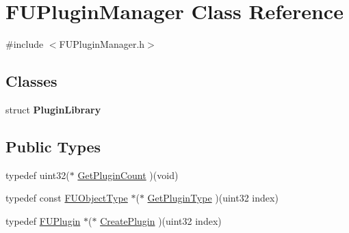 \hypertarget{classFUPluginManager}{
\section{FUPluginManager Class Reference}
\label{classFUPluginManager}
}


{\ttfamily \#include $<$FUPluginManager.h$>$}

\subsection*{Classes}
\begin{DoxyCompactItemize}
\item 
struct {\bfseries PluginLibrary}
\end{DoxyCompactItemize}
\subsection*{Public Types}
\begin{DoxyCompactItemize}
\item 
typedef uint32($\ast$ \hyperlink{classFUPluginManager_aa7465d51db4f1f1e0386310ae6922250}{GetPluginCount} )(void)
\item 
typedef const \hyperlink{classFUObjectType}{FUObjectType} $\ast$($\ast$ \hyperlink{classFUPluginManager_ad253785d39bca14d77ddf9d9181e7fb1}{GetPluginType} )(uint32 index)
\item 
typedef \hyperlink{classFUPlugin}{FUPlugin} $\ast$($\ast$ \hyperlink{classFUPluginManager_a8e4ad834c03cad334f3bbd6158416a43}{CreatePlugin} )(uint32 index)
\end{DoxyCompactItemize}
